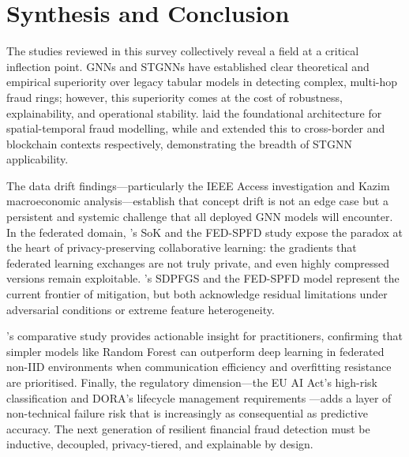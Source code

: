\documentclass[12pt, a4paper]{article}
\begin{document}
\section{Synthesis and Conclusion}

The studies reviewed in this survey collectively reveal a field at a critical inflection point. GNNs and STGNNs have established clear theoretical and empirical superiority over legacy tabular models in detecting complex, multi-hop fraud rings; however, this superiority comes at the cost of robustness, explainability, and operational stability. \cite{cheng2022stagn} laid the foundational architecture for spatial-temporal fraud modelling, while \cite{gummadi2025temporal} and \cite{harper2025blockchain} extended this to cross-border and blockchain contexts respectively, demonstrating the breadth of STGNN applicability.

The data drift findings---particularly the IEEE Access investigation \cite{ieeeaccess2025drift} and Kazim \cite{kazim2025drift} macroeconomic analysis---establish that concept drift is not an edge case but a persistent and systemic challenge that all deployed GNN models will encounter. In the federated domain, \cite{du2025hcgla}'s SoK and the FED-SPFD study \cite{fedspfd2025mdpi} expose the paradox at the heart of privacy-preserving collaborative learning: the gradients that federated learning exchanges are not truly private, and even highly compressed versions remain exploitable. \cite{guo2025sdpfgs}'s SDPFGS and the FED-SPFD model represent the current frontier of mitigation, but both acknowledge residual limitations under adversarial conditions or extreme feature heterogeneity.

\cite{sun2025flfraud}'s comparative study provides actionable insight for practitioners, confirming that simpler models like Random Forest can outperform deep learning in federated non-IID environments when communication efficiency and overfitting resistance are prioritised. Finally, the regulatory dimension---the EU AI Act's high-risk classification \cite{euaiact2024} and DORA's lifecycle management requirements \cite{dora2025}---adds a layer of non-technical failure risk that is increasingly as consequential as predictive accuracy. The next generation of resilient financial fraud detection must be inductive, decoupled, privacy-tiered, and explainable by design.


\end{document}
